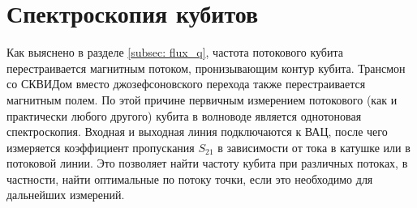 \section{Спектроскопия кубитов}

Как выяснено в разделе \ref{subsec: flux_q}, частота потокового кубита перестраивается магнитным потоком, пронизывающим контур кубита. Трансмон со СКВИДом вместо джозефсоновского перехода также перестраивается магнитным полем. По этой причине первичным измерением потокового (как и практически любого другого) кубита в волноводе является однотоновая спектроскопия. Входная и выходная линия подключаются к ВАЦ, после чего измеряется коэффициент пропускания $S_{21}$ в зависимости от тока в катушке или в потоковой линии. Это позволяет найти частоту кубита при различных потоках, в частности, найти оптимальные по потоку точки, если это необходимо для дальнейших измерений. 

